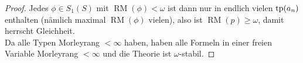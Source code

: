 \begin{proof}
        Jedes $\phi\in S_1(S)$ mit $\operatorname{RM}(\phi)<\omega$ ist dann nur in endlich vielen $\operatorname{tp}(a_n)$ enthalten (nämlich maximal $\operatorname{RM}(\phi)$ vielen), also ist $\operatorname{RM}(p)\geq\omega$, damit herrscht Gleichheit.\\
        Da alle Typen Morleyrang $<\infty$ haben, haben alle Formeln in einer freien Variable Morleyrang $<\infty$ und die Theorie ist $\omega$-stabil.
    \end{proof}